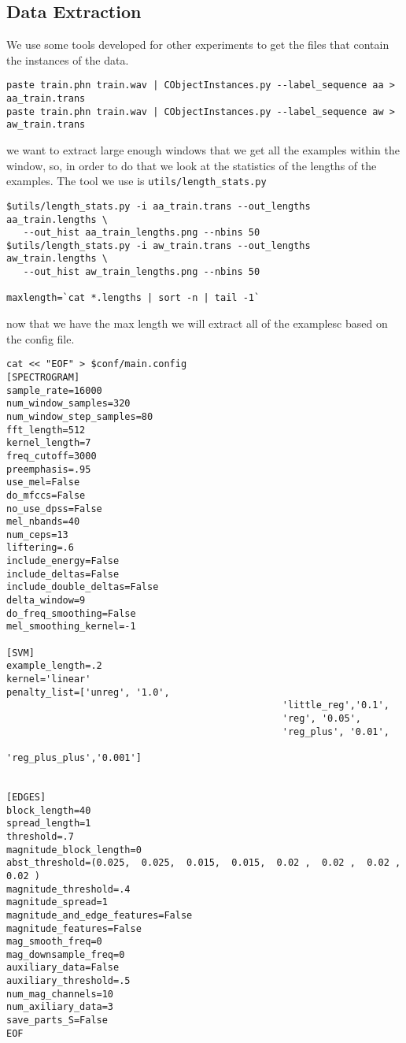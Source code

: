 \documentclass{article}
\begin{document}
\subsection{Data Extraction}

We use some tools developed for other experiments to get the
files that contain the instances of the data.
\begin{verbatim}
paste train.phn train.wav | CObjectInstances.py --label_sequence aa > aa_train.trans
paste train.phn train.wav | CObjectInstances.py --label_sequence aw > aw_train.trans
\end{verbatim}
we want to extract large enough windows that we get all the examples
within the window, so, in order to do that we look at the 
statistics of the lengths of the examples.  The tool we use
is \texttt{utils/length\_stats.py}
\begin{verbatim}
$utils/length_stats.py -i aa_train.trans --out_lengths aa_train.lengths \
   --out_hist aa_train_lengths.png --nbins 50
$utils/length_stats.py -i aw_train.trans --out_lengths aw_train.lengths \
   --out_hist aw_train_lengths.png --nbins 50

maxlength=`cat *.lengths | sort -n | tail -1`
\end{verbatim}
now that we have the max length we will extract all of the examplesc
based on the config file.
\begin{verbatim}
cat << "EOF" > $conf/main.config
[SPECTROGRAM]
sample_rate=16000
num_window_samples=320
num_window_step_samples=80
fft_length=512
kernel_length=7
freq_cutoff=3000
preemphasis=.95
use_mel=False
do_mfccs=False
no_use_dpss=False
mel_nbands=40
num_ceps=13
liftering=.6
include_energy=False
include_deltas=False
include_double_deltas=False
delta_window=9
do_freq_smoothing=False
mel_smoothing_kernel=-1

[SVM]
example_length=.2
kernel='linear'
penalty_list=['unreg', '1.0',
                                                 'little_reg','0.1',
                                                 'reg', '0.05',
                                                 'reg_plus', '0.01',
                                                 'reg_plus_plus','0.001']


[EDGES]
block_length=40
spread_length=1
threshold=.7
magnitude_block_length=0
abst_threshold=(0.025,  0.025,  0.015,  0.015,  0.02 ,  0.02 ,  0.02 ,  0.02 )
magnitude_threshold=.4
magnitude_spread=1
magnitude_and_edge_features=False
magnitude_features=False
mag_smooth_freq=0
mag_downsample_freq=0
auxiliary_data=False
auxiliary_threshold=.5
num_mag_channels=10
num_axiliary_data=3
save_parts_S=False
EOF
\end{verbatim}
\end{document}
